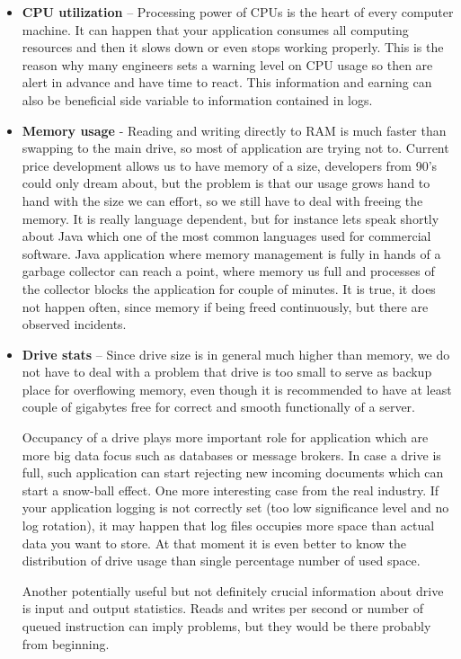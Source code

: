 \begin{itemize}
    \item \textbf{CPU utilization} – Processing power of CPUs is the heart of every computer machine. It can happen that your application consumes all computing resources and then it slows down or even stops working properly. This is the reason why many engineers sets a warning level on CPU usage so then are alert in advance and have time to react. This information and earning can also be beneficial side variable to information contained in logs.
    
    \item \textbf{Memory usage} - Reading and writing directly to RAM is much faster than swapping to the main drive, so most of application are trying not to. Current price development allows us to have memory of a size, developers from 90's could only dream about, but the problem is that our usage grows hand to hand with the size we can effort, so we still have to deal with freeing the memory. It is really language dependent, but for instance lets speak shortly about Java which one of the most common languages used for commercial software. Java application where memory management is fully in hands of a garbage collector can reach a point, where memory us full and processes of the collector blocks the application for couple of minutes. It is true, it does not happen often, since memory if being freed continuously, but there are observed incidents.
    
    \item \textbf{Drive stats} – Since drive size is in general much higher than memory, we do not have to deal with a problem that drive is too small to serve as backup place for overflowing memory, even though it is recommended to have at least couple of gigabytes free for correct and smooth functionally of a server. 
    
    Occupancy of a drive plays more important role for application which are more big data focus such as databases or message brokers. In case a drive is full, such application can start rejecting new incoming documents which can start a snow-ball effect. One more interesting case from the real industry. If your application logging is not correctly set (too low significance level and no log rotation), it may happen that log files occupies more space than actual data you want to store. At that moment it is even better to know the distribution of drive usage than single percentage number of used space.
    
    Another potentially useful but not definitely crucial information about drive is input and output statistics. Reads and writes per second or number of queued instruction can imply problems, but they would be there probably from beginning.  
    

\end{itemize}
